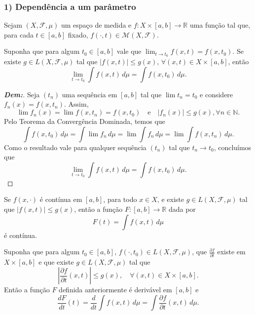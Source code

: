
\subsubsection*{1) Dependência a um parâmetro}

Sejam $(X, \mathcal{F}, \mu)$ um espaço de medida e $f: X \times [a,b] \rightarrow \mathbb{R}$ uma função tal que, para cada $t \in [a,b]$ fixado, $f(\cdot, t) \in \mathcal{M}(X,\mathcal{F})$.

\begin{prop*}{}
Suponha que para algum $t_0 \in [a,b]$ vale que $\lim_{t \rightarrow t_0} f(x,t) = f(x,t_0)$. Se existe $g \in L(X, \mathcal{F}, \mu)$ tal que $|f(x,t)| \le g(x)$, $\forall (x,t) \in X \times [a,b]$, então
$$ \lim_{t \rightarrow t_0} \int f(x,t) \, d\mu = \int f(x,t_0) \, d\mu. $$
\end{prop*}

\begin{proof}[\textbf{Dem:}]
Seja $(t_n)$ uma sequência em $[a,b]$ tal que $\lim t_n = t_0$ e considere $f_n(x) = f(x,t_n)$. Assim,
$$ \lim f_n(x) = \lim f(x,t_n) = f(x,t_0) \quad \text{e} \quad |f_n(x)| \le g(x), \forall n \in \mathbb{N}. $$
Pelo Teorema da Convergência Dominada, temos que
$$ \int f(x,t_0) \, d\mu = \int \lim f_n \, d\mu = \lim \int f_n \, d\mu = \lim \int f(x,t_n) \, d\mu. $$
Como o resultado vale para qualquer sequência $(t_n)$ tal que $t_n \rightarrow t_0$, concluímos que
$$ \lim_{t \rightarrow t_0} \int f(x,t) \, d\mu = \int f(x,t_0) \, d\mu. $$
\end{proof}

\begin{corollary*}{}
Se $f(x, \cdot)$ é contínua em $[a,b]$, para todo $x \in X$, e existe $g \in L(X, \mathcal{F}, \mu)$ tal que $|f(x,t)| \le g(x)$, então a função $F: [a,b] \rightarrow \mathbb{R}$ dada por
$$ F(t) = \int f(x,t) \, d\mu $$
é contínua.
\end{corollary*}

\begin{prop*}{}
Suponha que para algum $t_0 \in [a,b]$, $f(\cdot, t_0) \in L(X, \mathcal{F}, \mu)$, que $\frac{\partial f}{\partial t}$ existe em $X \times [a,b]$ e que existe $g \in L(X, \mathcal{F}, \mu)$ tal que
$$ \left| \frac{\partial f}{\partial t}(x,t) \right| \le g(x), \quad \forall (x,t) \in X \times [a,b]. $$
Então a função $F$ definida anteriormente é derivável em $[a,b]$ e
$$ \frac{dF}{dt}(t) = \frac{d}{dt} \int f(x,t) \, d\mu = \int \frac{\partial f}{\partial t}(x,t) \, d\mu. $$
\end{prop*}

